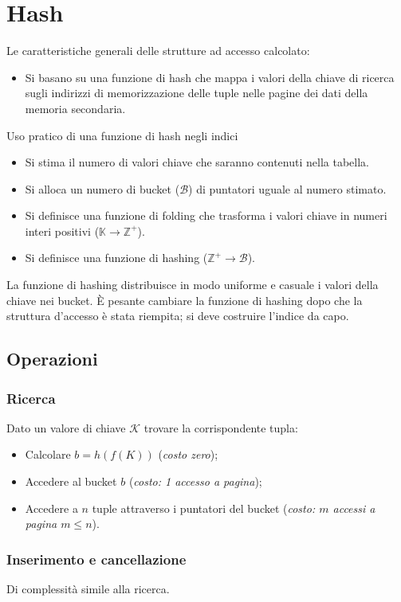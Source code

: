 \documentclass[oneside,a4paper,11pt]{book}
\theoremstyle{italicstyle}
\theoremstyle{normStyle}
\begin{document}
\section{Hash}
Le caratteristiche generali delle strutture ad accesso calcolato:
\begin{itemize}
  \item Si basano su una funzione di hash che mappa i valori della chiave di ricerca 
  sugli indirizzi di memorizzazione delle tuple nelle pagine dei dati della 
  memoria secondaria.
\end{itemize}
Uso pratico di una funzione di hash negli indici 
\begin{itemize}
  \item Si stima il numero di valori chiave che saranno contenuti nella tabella.
  \item Si alloca un numero di bucket ($\mathcal{B}$) di puntatori uguale al numero stimato.
  \item Si definisce una funzione di folding che trasforma i valori chiave in 
  numeri interi positivi ($\mathbb{K}\rightarrow\mathbb{Z}^+$).
  \item Si definisce una funzione di hashing ($\mathbb{Z}^+\rightarrow\mathcal{B}$).
\end{itemize}
La funzione di hashing distribuisce in modo uniforme e casuale i valori della 
chiave nei bucket. È pesante cambiare la funzione di hashing dopo che la struttura 
d'accesso è stata riempita; si deve costruire l'indice da capo.
\subsection{Operazioni}
\subsubsection{Ricerca}
Dato un valore di chiave $\mathcal{K}$ trovare la corrispondente tupla:
\begin{itemize}
  \item Calcolare $b = h(f({K}))$ (\textit{costo zero});
  \item Accedere al bucket $b$ (\textit{costo: 1 accesso a pagina});
  \item Accedere a $n$ tuple attraverso i puntatori del bucket (\textit{costo: 
  $m$ accessi a pagina $m \leq n$}).
\end{itemize}
\subsubsection{Inserimento e cancellazione}
Di complessità simile alla ricerca.
\end{document}
